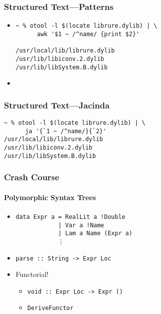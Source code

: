 \documentclass{beamer}
\begin{document}

\begin{frame}[fragile]
  \frametitle{Structured Text---Patterns}
  \begin{itemize}
    \item
      \begin{verbatim}
~ % otool -l $(locate librure.dylib) | \
      awk '$1 ~ /^name/ {print $2}'

/usr/local/lib/librure.dylib
/usr/lib/libiconv.2.dylib
/usr/lib/libSystem.B.dylib
      \end{verbatim}
    \item ~ 
  \end{itemize}
\end{frame}

\begin{frame}[fragile]
  \frametitle{Structured Text---Jacinda}
  \begin{verbatim}
~ % otool -l $(locate librure.dylib) | \
      ja '{`1 ~ /^name/}{`2}'
/usr/local/lib/librure.dylib
/usr/lib/libiconv.2.dylib
/usr/lib/libSystem.B.dylib
  \end{verbatim}
\end{frame}


\begin{frame}[fragile]
  \frametitle{Crash Course}
  \framesubtitle{Polymorphic Syntax Trees}
    \begin{itemize}
      \item
      \begin{verbatim}
data Expr a = RealLit a !Double
            | Var a !Name
            | Lam a Name (Expr a)
            ⋮
\end{verbatim}
      \item \verb|parse :: String -> Expr Loc|
      \item Functorial!
        \begin{itemize}
          \item \verb|void :: Expr Loc -> Expr ()|
          \item \verb|DeriveFunctor|
        \end{itemize}
    \end{itemize}
\end{frame}
\end{document}
